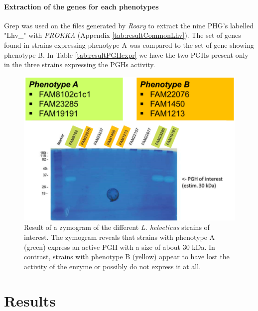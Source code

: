 \documentclass[10pt,a4paper]{article}
\begin{document}
\paragraph{Extraction of the genes for each phenotypes} Grep was used on the files generated by \textit{Roary} to extract the nine PHG's \cite{jebava_nine_2011} labelled "Lhv\_" with \textit{PROKKA} (Appendix \ref{tab:resultCommonLhv}). The set of genes found in strains expressing phenotype A was compared to the set of gene showing phenotype B. In Table \ref{tab:resultPGHexpr} we have the two PGHs present only in the three strains expressing the PGHs activity. 


\begin{figure}
	\centering
	\includegraphics[width=0.7\linewidth]{img/zymography}
	\caption[The two phenotypes expressed by the six strains]{Result of a zymogram of the different \textit{L. helveticus} strains of interest. The zymogram reveals that strains with phenotype A (green) express an active PGH with a size of about 30 kDa. In contrast, strains with phenotype B (yellow) appear to have lost the activity of the enzyme or possibly do not express it at all.}
	\label{fig:zymography}
\end{figure}


\section*{\large Results}
\end{document}
